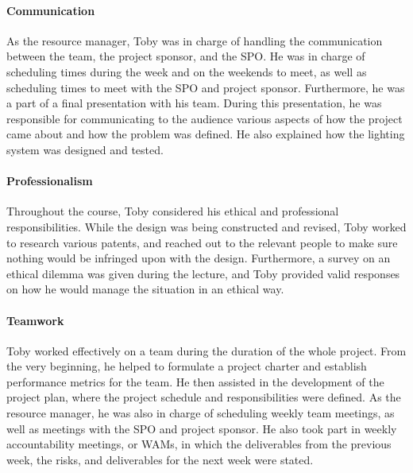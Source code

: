 \documentclass[../../main.tex]{subfiles}
\begin{document}
\paragraph{Communication}
\par As the resource manager, Toby was in charge of handling the communication between the team, the project sponsor, and the SPO. He was in charge of scheduling times during the week and on the weekends to meet, as well as scheduling times to meet with the SPO and project sponsor. Furthermore, he was a part of a final presentation with his team. During this presentation, he was responsible for communicating to the audience various aspects of how the project came about and how the problem was defined. He also explained how the lighting system was designed and tested.

\paragraph{Professionalism}
\par Throughout the course, Toby considered his ethical and professional responsibilities. While the design was being constructed and revised, Toby worked to research various patents, and reached out to the relevant people to make sure nothing would be infringed upon with the design. Furthermore, a survey on an ethical dilemma was given during the lecture, and Toby provided valid responses on how he would manage the situation in an ethical way.


\paragraph{Teamwork}
\par Toby worked effectively on a team during the duration of the whole project. From the very beginning, he helped to formulate a project charter and establish performance metrics for the team. He then assisted in the development of the project plan, where the project schedule and responsibilities were defined. As the resource manager, he was also in charge of scheduling weekly team meetings, as well as meetings with the SPO and project sponsor. He also took part in weekly accountability meetings, or WAMs, in which the deliverables from the previous week, the risks, and deliverables for the next week were stated. 
\end{document}
